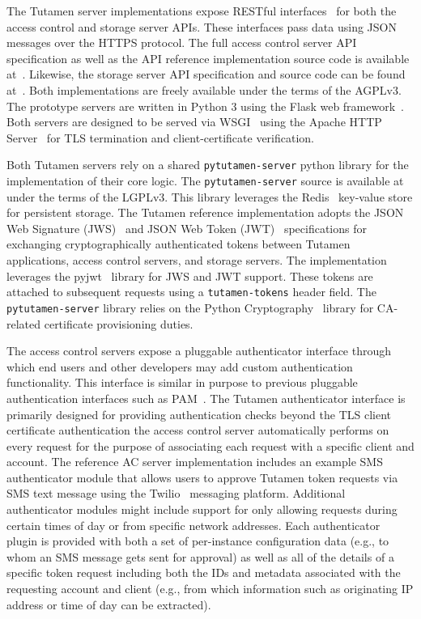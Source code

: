 The Tutamen server implementations expose RESTful
interfaces~\cite{fielding2000} for both the access control and storage
server APIs. These interfaces pass data using JSON~\cite{json}
messages over the HTTPS protocol. The full access control server API
specification as well as the API reference implementation source code
is available at~\cite{src-tutamen-apiaccesscontrol}. Likewise, the
storage server API specification and source code can be found
at~\cite{src-tutamen-apistorage}. Both implementations are freely
available under the terms of the AGPLv3. The prototype servers are
written in Python 3 using the Flask web
framework~\cite{python-flask}. Both servers are designed to be served
via WSGI~\cite{pep3333} using the Apache HTTP Server~\cite{apache} for
TLS termination and client-certificate verification.

Both Tutamen servers rely on a shared \texttt{pytutamen-server} python
library for the implementation of their core logic. The
\texttt{pytutamen-server} source is available
at~\cite{src-tutamen-pytutamenserver} under the terms of the
LGPLv3. This library leverages the Redis~\cite{redis} key-value store
for persistent storage. The Tutamen reference implementation adopts
the JSON Web Signature (JWS)~\cite{rfc7515} and JSON Web Token
(JWT)~\cite{rfc7519} specifications for exchanging cryptographically
authenticated tokens between Tutamen applications, access control
servers, and storage servers. The implementation leverages the
pyjwt~\cite{pyjwt} library for JWS and JWT support. These tokens are
attached to subsequent requests using a \texttt{tutamen-tokens} header
field. The \texttt{pytutamen-server} library relies on the Python
Cryptography~\cite{python-cryptography} library for CA-related
certificate provisioning duties.

The access control servers expose a pluggable authenticator interface
through which end users and other developers may add custom
authentication functionality. This interface is similar in purpose to
previous pluggable authentication interfaces such as
PAM~\cite{samar1996}. The Tutamen authenticator interface is primarily
designed for providing authentication checks beyond the TLS client
certificate authentication the access control server automatically
performs on every request for the purpose of associating each request
with a specific client and account. The reference AC server
implementation includes an example SMS authenticator module that
allows users to approve Tutamen token requests via SMS text message
using the Twilio~\cite{twilio} messaging platform. Additional
authenticator modules might include support for only allowing requests
during certain times of day or from specific network addresses. Each
authenticator plugin is provided with both a set of per-instance
configuration data (e.g., to whom an SMS message gets sent for
approval) as well as all of the details of a specific token request
including both the IDs and metadata associated with the requesting
account and client (e.g., from which information such as originating
IP address or time of day can be extracted).

